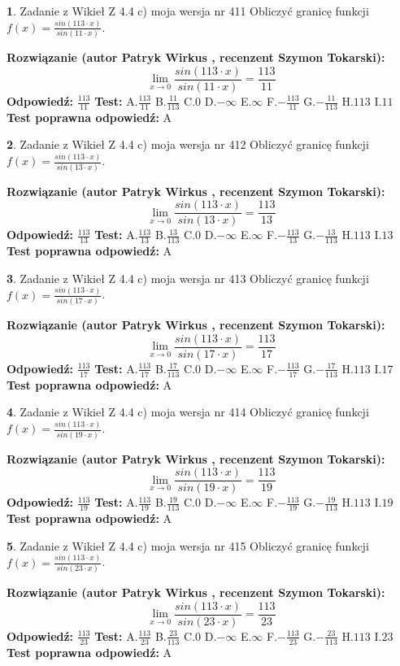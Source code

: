 \documentclass[12pt, a4paper]{article}
\theoremstyle{definition} %
\newtheorem{zad}{}
\newcommand{\zadStart}[1]{\begin{zad}#1\newline}
\newcommand{\zadStop}{\end{zad}}
\newcommand{\rozwStart}[2]{\noindent \textbf{Rozwiązanie (autor #1 , recenzent #2): }\newline}
\newcommand{\rozwStop}{\newline}
\newcommand{\odpStart}{\noindent \textbf{Odpowiedź:}\newline}
\newcommand{\odpStop}{\newline}
\newcommand{\testStart}{\noindent \textbf{Test:}\newline}
\newcommand{\testStop}{\newline}
\newcommand{\kluczStart}{\noindent \textbf{Test poprawna odpowiedź:}\newline}
\newcommand{\kluczStop}{\newline}
\begin{document}
\zadStart{Zadanie z Wikieł Z 4.4 c) moja wersja nr 411}
Obliczyć granicę funkcji $f(x)=\frac{sin(113\cdot x)}{sin(11\cdot x)}$.
\zadStop
\rozwStart{Patryk Wirkus}{Szymon Tokarski}
$$\lim\limits_{x\to 0}\frac{sin(113\cdot x)}{sin(11\cdot x)}=
\frac{113}{11}$$
\rozwStop
\odpStart
$\frac{113}{11}$
\odpStop
\testStart
A.$\frac{113}{11}$
B.$\frac{11}{113}$
C.$0$
D.$-\infty$
E.$\infty$
F.$-\frac{113}{11}$
G.$-\frac{11}{113}$
H.$113$
I.$11$
\testStop
\kluczStart
A
\kluczStop



\zadStart{Zadanie z Wikieł Z 4.4 c) moja wersja nr 412}
Obliczyć granicę funkcji $f(x)=\frac{sin(113\cdot x)}{sin(13\cdot x)}$.
\zadStop
\rozwStart{Patryk Wirkus}{Szymon Tokarski}
$$\lim\limits_{x\to 0}\frac{sin(113\cdot x)}{sin(13\cdot x)}=
\frac{113}{13}$$
\rozwStop
\odpStart
$\frac{113}{13}$
\odpStop
\testStart
A.$\frac{113}{13}$
B.$\frac{13}{113}$
C.$0$
D.$-\infty$
E.$\infty$
F.$-\frac{113}{13}$
G.$-\frac{13}{113}$
H.$113$
I.$13$
\testStop
\kluczStart
A
\kluczStop



\zadStart{Zadanie z Wikieł Z 4.4 c) moja wersja nr 413}
Obliczyć granicę funkcji $f(x)=\frac{sin(113\cdot x)}{sin(17\cdot x)}$.
\zadStop
\rozwStart{Patryk Wirkus}{Szymon Tokarski}
$$\lim\limits_{x\to 0}\frac{sin(113\cdot x)}{sin(17\cdot x)}=
\frac{113}{17}$$
\rozwStop
\odpStart
$\frac{113}{17}$
\odpStop
\testStart
A.$\frac{113}{17}$
B.$\frac{17}{113}$
C.$0$
D.$-\infty$
E.$\infty$
F.$-\frac{113}{17}$
G.$-\frac{17}{113}$
H.$113$
I.$17$
\testStop
\kluczStart
A
\kluczStop



\zadStart{Zadanie z Wikieł Z 4.4 c) moja wersja nr 414}
Obliczyć granicę funkcji $f(x)=\frac{sin(113\cdot x)}{sin(19\cdot x)}$.
\zadStop
\rozwStart{Patryk Wirkus}{Szymon Tokarski}
$$\lim\limits_{x\to 0}\frac{sin(113\cdot x)}{sin(19\cdot x)}=
\frac{113}{19}$$
\rozwStop
\odpStart
$\frac{113}{19}$
\odpStop
\testStart
A.$\frac{113}{19}$
B.$\frac{19}{113}$
C.$0$
D.$-\infty$
E.$\infty$
F.$-\frac{113}{19}$
G.$-\frac{19}{113}$
H.$113$
I.$19$
\testStop
\kluczStart
A
\kluczStop



\zadStart{Zadanie z Wikieł Z 4.4 c) moja wersja nr 415}
Obliczyć granicę funkcji $f(x)=\frac{sin(113\cdot x)}{sin(23\cdot x)}$.
\zadStop
\rozwStart{Patryk Wirkus}{Szymon Tokarski}
$$\lim\limits_{x\to 0}\frac{sin(113\cdot x)}{sin(23\cdot x)}=
\frac{113}{23}$$
\rozwStop
\odpStart
$\frac{113}{23}$
\odpStop
\testStart
A.$\frac{113}{23}$
B.$\frac{23}{113}$
C.$0$
D.$-\infty$
E.$\infty$
F.$-\frac{113}{23}$
G.$-\frac{23}{113}$
H.$113$
I.$23$
\testStop
\kluczStart
A
\kluczStop
\end{document}
